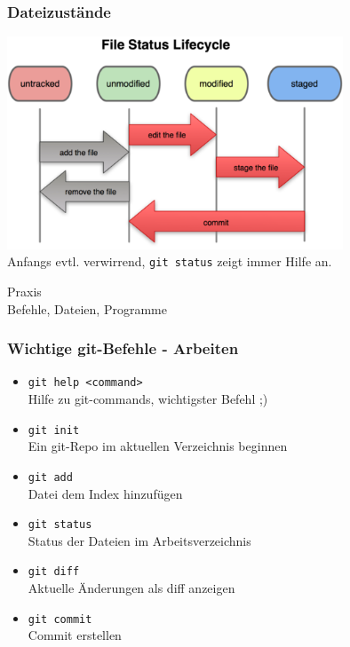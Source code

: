 \begin{frame}
  \frametitle{Dateizustände}
  \vspace{-0.3cm}
  \begin{center}
    \includegraphics[width=10cm]{img/tracked.png} \\
    Anfangs evtl. verwirrend, {\tt git status} zeigt immer Hilfe an.
  \end{center}
\end{frame}

\begin{frame}
  \begin{center}
  \Huge Praxis \\
  \small Befehle, Dateien, Programme
  \end{center}
\end{frame}

\begin{frame}
  \frametitle{Wichtige git-Befehle - Arbeiten}
  \begin{itemize}
    \item {\tt git help <command>} \\ Hilfe zu git-commands, wichtigster Befehl ;)
    \item {\tt git init} \\ Ein git-Repo im aktuellen Verzeichnis beginnen
    \item {\tt git add} \\ Datei dem Index hinzufügen
    \item {\tt git status} \\ Status der Dateien im Arbeitsverzeichnis
    \item {\tt git diff} \\ Aktuelle Änderungen als diff anzeigen
    \item {\tt git commit} \\ Commit erstellen
  \end{itemize}
\end{frame}

